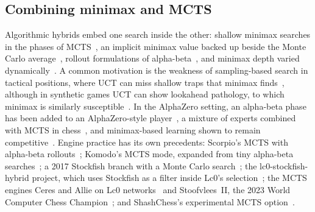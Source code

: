 \documentclass{article}
\begin{document}
\subsection{Combining minimax and MCTS}
Algorithmic hybrids embed one search inside the other: shallow minimax searches in the phases of MCTS~\cite{baier2013,baier2015,baier2018}, an implicit minimax value backed up beside the Monte Carlo average~\cite{lanctot2014}, rollout formulations of alpha-beta~\cite{huang2015,baier2017}, and minimax depth varied dynamically~\cite{ji2023}. A common motivation is the weakness of sampling-based search in tactical positions, where UCT can miss shallow traps that minimax finds~\cite{ramanujan2010}, although in synthetic games UCT can show lookahead pathology, to which minimax is similarly susceptible~\cite{nguyen2024}. In the AlphaZero setting, an alpha-beta phase has been added to an AlphaZero-style player~\cite{chen2019}, a mixture of experts combined with MCTS in chess~\cite{helfenstein2024}, and minimax-based learning shown to remain competitive~\cite{cohen2023}. Engine practice has its own precedents: Scorpio's MCTS with alpha-beta rollouts~\cite{scorpio}; Komodo's MCTS mode, expanded from tiny alpha-beta searches~\cite{komodo}; a 2017 Stockfish branch with a Monte Carlo search~\cite{sfmcts2017}; the lc0-stockfish-hybrid project, which uses Stockfish as a filter inside Lc0's selection~\cite{lc0sfhybrid}; the MCTS engines Ceres and Allie on Lc0 networks~\cite{ceres,allie} and Stoofvlees~II, the 2023 World Computer Chess Champion~\cite{pascutto2025}; and ShashChess's experimental MCTS option~\cite{shashchess}.
\end{document}
